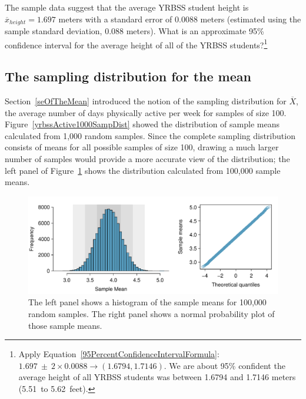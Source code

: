 \begin{spacing}{1.5}
\begin{exercise} \label{95CIExerciseForAgeOfYrbssSamp1}
The sample data suggest that the average YRBSS student height is $\overline{x}_{height} = 1.697$ meters with a standard error of 0.0088 meters (estimated using the sample standard deviation, 0.088 meters). What is an approximate 95\% confidence interval for the average height of all of the YRBSS students?\footnote{Apply Equation~\ref{95PercentConfidenceIntervalFormula}: $1.697 \ \pm \ 2\times 0.0088 \rightarrow (1.6794, 1.7146)$.  We are about 95\% confident the average height of all YRBSS students was between 1.6794 and 1.7146 meters (5.51~to 5.62~feet).}
\end{exercise}

\subsection{The sampling distribution for the mean}

Section~\ref{seOfTheMean} introduced the notion of the sampling distribution for $\overline{X}$, the average number of days physically active per week for samples of size 100. Figure~\ref{yrbssActive1000SampDist} showed the distribution of sample means calculated from 1,000 random samples. Since the complete sampling distribution consists of means for all possible samples of size 100, drawing a much larger number of samples would provide a more accurate view of the distribution; the left panel of Figure~\ref{yrbssActiveBigSampDist} shows the distribution calculated from 100,000 sample means. 

\begin{figure}[hht]
   \centering
   \includegraphics[width=\textwidth]
{ch_inference_foundations_oi_biostat/figures/yrbssActiveBigSampDist/yrbssActiveBigSampDist}
   \caption{The left panel shows a histogram of the sample means for 100,000 random samples. The right panel shows a normal probability plot of those sample means.}
   \label{yrbssActiveBigSampDist}
\end{figure}


\end{spacing}
